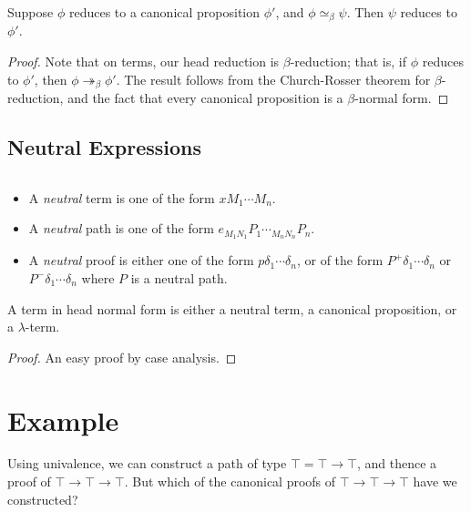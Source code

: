 \documentclass[a4paper,UKenglish]{lipics-v2016}
\theoremstyle{plain}
\begin{document}
\begin{lemma}
\label{lm:compat-beta}
Suppose $\phi$ reduces to a canonical proposition $\phi'$, and $\phi \simeq_\beta \psi$.  Then $\psi$ reduces to $\phi'$.
\end{lemma}

\begin{proof}
Note that on terms, our head reduction is $\beta$-reduction; that is, if $\phi$ reduces to $\phi'$, then $\phi \twoheadrightarrow_\beta \phi'$.
The result follows from the Church-Rosser theorem for $\beta$-reduction, and the fact that every canonical proposition is a $\beta$-normal form.
\end{proof}

\subsection{Neutral Expressions}

\begin{definition}[Neutral]$ $
\begin{itemize}
\item
A \emph{neutral} term is one of the form $x M_1 \cdots M_n$.
\item
A \emph{neutral} path is one of the form $e_{M_1 N_1} P_1 \cdots_{M_n N_n} P_n$.
\item
A \emph{neutral} proof is either one of the form $p \delta_1 \cdots \delta_n$, or of the form $P^+ \delta_1 \cdots \delta_n$ or
$P^- \delta_1 \cdots \delta_n$ where $P$ is a neutral path.
\end{itemize}
\end{definition}

\begin{lemma}
A term in head normal form is either a neutral term, a canonical proposition, or a $\lambda$-term.
\end{lemma}

\begin{proof}
An easy proof by case analysis.
\end{proof}

\section{Example}

Using univalence, we can construct a path of type $\top = \top \rightarrow \top$, and thence a proof of $\top \rightarrow \top \rightarrow \top$.
But which of the canonical proofs of $\top \rightarrow \top \rightarrow \top$ have we constructed?
\end{document}
